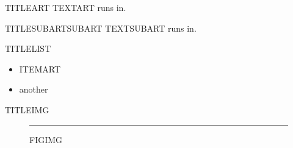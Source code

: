 \documentclass[a4paper]{article}
\begin{document}
\begin{frame}{TITLEART}
  TEXTART runs in.
\end{frame}
\begin{frame}{TITLESUBART}{SUBART}
  TEXTSUBART runs in.
\end{frame}
\begin{frame}{TITLELIST}
  \begin{itemize}
  \item ITEMART
  \item another
  \end{itemize}
\end{frame}
\begin{frame}{TITLEIMG}
  \begin{figure}[h]
    \centering\rule{3cm}{1cm}
    \caption{FIGIMG}
  \end{figure}
\end{frame}
\end{document}

